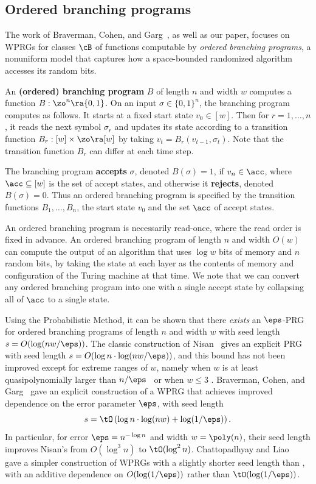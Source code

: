 \subsection{Ordered branching programs}

    The work of Braverman, Cohen, and Garg~\cite{BravermanCoGa18}, as well as our paper, focuses
    on WPRGs for classes $\cB$ of functions computable by \emph{ordered branching programs}, a nonuniform model that captures how a space-bounded randomized algorithm accesses its random bits.
	
	\begin{definition} \label{def:obp}
	An \textbf{(ordered) branching program} $B$ of length $n$ and width $w$ computes a function $B:\zo^n \ra \{0,1\}$. On an input $\sigma\in\{0,1\}^n$, the branching program computes as follows. It starts at a fixed start state $v_0\in [w]$. Then for $r=1,\ldots,n$, it reads the next symbol $\sigma_r$ and updates its state according to a transition function $B_r:[w]\times \zo\ra[w]$ by taking $v_{t}=B_r(v_{t-1},\sigma_t)$. Note that the transition function $B_r$ can differ at each time step. 
	
	The branching program \textbf{accepts} $\sigma$, denoted $B(\sigma)=1$, if $v_{n}\in \acc$, where $\acc \subseteq [w]$ is the set of accept states, and otherwise it \textbf{rejects}, denoted $B(\sigma)=0$.
	Thus an ordered branching program is specified by the transition functions $B_1,\ldots,B_n$, the start state $v_0$ and the set $\acc$ of accept states.
	\end{definition}
	An ordered branching program is necessarily read-once, where the read order is fixed in advance.
	An ordered branching program of length $n$ and width $O(w)$ can compute the output of an algorithm that uses $\log w$ bits of memory and $n$ random bits, by taking the state at each layer as the contents of memory and configuration of the Turing machine at that time.  We note that we can convert any ordered branching program into one with a single accept state by collapsing all of $\acc$ to a single state.
	
	Using the Probabilistic Method, it can be shown that there \emph{exists} an $\eps$-PRG for ordered branching programs of length $n$ and width $w$ with seed length
	$s=O(\log(nw/\eps))$.  The classic construction of Nisan~\cite{Nisan92} gives an explicit
	PRG with seed length $s = O(\log n \cdot \log(nw/\eps))$, and this bound has not been improved except for extreme ranges of $w$, namely when
	$w$ is at least quasipolynomially larger than $n/\eps$~\cite{NisanZu96,Armoni98,KaneNeWo08} or when $w\leq 3$ \cite{BogdanovDvVeYe09,SimaZa11,GopalanMeReTrVa12,MekaReTa18}.
	Braverman, Cohen, and Garg~\cite{BravermanCoGa18} gave an explicit construction of a WPRG that achieves improved dependence on the error parameter $\eps$, with seed length  $$s=\tO\left(\log n\cdot \log(nw) + \log(1/\eps)\right).$$
	In particular, for error $\eps=n^{-\log n}$ and width $w=\poly(n)$, their seed length improves Nisan's from $O(\log^3 n)$ to $\tO(\log^2 n)$.  
	Chattopadhyay %
    and Liao~\cite{ChattopadhyayLi20} gave a simpler construction of WPRGs with a slightly shorter seed length than \cite{BravermanCoGa18}, with an additive dependence on $O(\log(1/\eps))$ rather than $\tO(\log(1/\eps))$.

